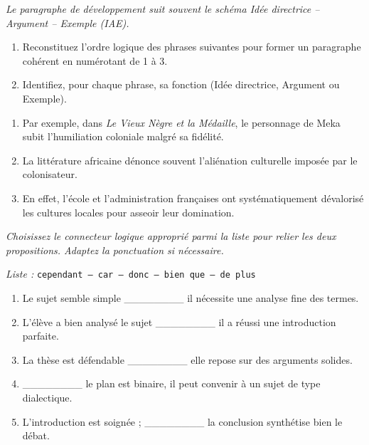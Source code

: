 \documentclass[11pt]{article}
\begin{document}
\begin{exercice}
\label{exo:iae}
\emph{Le paragraphe de développement suit souvent le schéma Idée directrice -- Argument -- Exemple (IAE).}
\begin{enumerate}
    \item Reconstituez l'ordre logique des phrases suivantes pour former un paragraphe cohérent en numérotant de 1 à 3.
    \item Identifiez, pour chaque phrase, sa fonction (Idée directrice, Argument ou Exemple).
\end{enumerate}
\begin{enumerate}
    \item[Phrase A :] Par exemple, dans \textit{Le Vieux Nègre et la Médaille}, le personnage de Meka subit l'humiliation coloniale malgré sa fidélité.
    \item[Phrase B :] La littérature africaine dénonce souvent l'aliénation culturelle imposée par le colonisateur.
    \item[Phrase C :] En effet, l'école et l'administration françaises ont systématiquement dévalorisé les cultures locales pour asseoir leur domination.
\end{enumerate}
\end{exercice}

\begin{exercice}
\label{exo:liaison}
\emph{Choisissez le connecteur logique approprié parmi la liste pour relier les deux propositions. Adaptez la ponctuation si nécessaire.}
\begin{center}
\textit{Liste :} \texttt{cependant -- car -- donc -- bien que -- de plus}
\end{center}
\begin{enumerate}
    \item Le sujet semble simple \_\_\_\_\_\_\_\_ il nécessite une analyse fine des termes.
    \item L'élève a bien analysé le sujet \_\_\_\_\_\_\_\_ il a réussi une introduction parfaite.
    \item La thèse est défendable \_\_\_\_\_\_\_\_ elle repose sur des arguments solides.
    \item \_\_\_\_\_\_\_\_ le plan est binaire, il peut convenir à un sujet de type dialectique.
    \item L'introduction est soignée ; \_\_\_\_\_\_\_\_ la conclusion synthétise bien le débat.
\end{enumerate}
\end{exercice}
\end{document}
